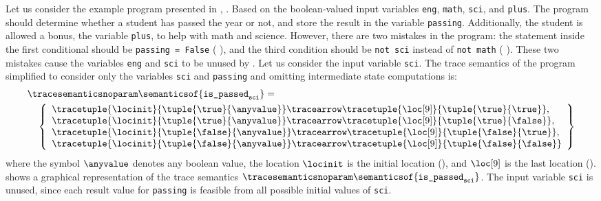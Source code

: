 \begin{example}
Let us consider the example program presented in \textcite{Urban2018}, \cf{} .
Based on the boolean-valued input variables \texttt{eng}, \texttt{math}, \texttt{sci}, and \texttt{plus}.
The program should determine whether a student has passed the year or not, and store the result in the variable \texttt{passing}. Additionally, the student is allowed a bonus, \cf{} the variable \texttt{plus}, to help with math and science.
However, there are two mistakes in the program: the statement inside the first conditional should be \texttt{passing = False} (\cf{} ), and the third condition should be \texttt{not sci} instead of \texttt{not math} (\cf{} ).
These two mistakes cause the variables \texttt{eng} and \texttt{sci} to be unused by .
Let us consider the input variable \texttt{sci}.
The trace semantics of the program simplified to consider only the variables \texttt{sci} and \texttt{passing} and omitting intermediate state computations is:
\begin{align*}
  &{\tracesemanticsnoparam\semanticsof{\texttt{is\_passed}_\texttt{sci}}
  =}\\
  &\quad\left\{
    \begin{array}{l}
      \tracetuple{\locinit}{\tuple{\true}{\anyvalue}}\tracearrow\tracetuple{\loc[9]}{\tuple{\true}{\true}}, \\
      \tracetuple{\locinit}{\tuple{\true}{\anyvalue}}\tracearrow\tracetuple{\loc[9]}{\tuple{\true}{\false}}, \\
      \tracetuple{\locinit}{\tuple{\false}{\anyvalue}}\tracearrow\tracetuple{\loc[9]}{\tuple{\false}{\true}}, \\
      \tracetuple{\locinit}{\tuple{\false}{\anyvalue}}\tracearrow\tracetuple{\loc[9]}{\tuple{\false}{\false}}
    \end{array}
  \right\}
\end{align*}
where the symbol $\anyvalue$ denotes any boolean value, the location $\locinit$ is the initial location (), and $\loc[9]$ is the last location ().
 shows a graphical representation of the trace semantics $\tracesemanticsnoparam\semanticsof{\texttt{is\_passed}_\texttt{sci}}$.
The input variable \texttt{sci} is unused, since each result value for \texttt{passing} is feasible from all possible initial values of \texttt{sci}.


\end{example}
